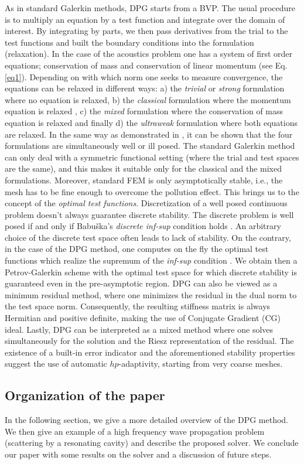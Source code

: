 As in standard Galerkin methods, DPG starts from a BVP. The usual procedure is to multiply an equation by a test function and integrate over the domain of interest. By integrating by parts, we then pass derivatives from the trial to the test functions and built the boundary conditions into the formulation (relaxation). In the case of the acoustics problem one has a system of first order equations; conservation of mass and conservation of linear momentum (see Eq. \ref{eq1}). Depending on with which norm one seeks to measure convergence, the equations can be relaxed in different ways: a) the \textit{trivial} or \textit{strong} formulation where no equation is relaxed, b) the \textit{classical} formulation where the momentum equation is relaxed , c) the \textit{mixed} formulation where the conservation of mass equation is relaxed and finally d) the \textit{ultraweak} formulation where both equations are relaxed. In the same way as demonstrated in \cite{demk_varform,Carstensen,MR3543022}, it can be shown that the four formulations are simultaneously well or ill posed. The standard Galerkin method can only deal with a symmetric functional setting (where the trial and test spaces are the same), and this makes it suitable only for the classical and the mixed formulations. Moreover, standard FEM is only asymptotically stable, i.e., the mesh has to be fine enough to overcome the pollution effect. This brings us to the concept of the \textit{optimal test functions}.
% 
Discretization of a well posed continuous problem doesn't always guarantee discrete stability. The discrete problem is well posed if and only if 
Babu\v{s}ka's \textit{discrete inf-sup} condition holds \cite{babuska}. An arbitrary choice of the discrete test space often leads to lack of stability. On the contrary, in the case of the DPG method, one computes on the fly the optimal test functions which realize the supremum of the \textit{inf-sup} condition \cite{dpg_opt}. We obtain then a Petrov-Galerkin scheme with the optimal test space for which discrete stability is guaranteed even in the pre-asymptotic region.
% 
DPG can also be viewed as a minimum residual method, where one minimizes the residual in the dual norm to the test space norm. Consequently, the resulting stiffness matrix is always Hermitian and positive definite, making the use of Conjugate Gradient (CG) ideal. 
% 
Lastly, DPG can be interpreted as a mixed method where one solves simultaneously for the solution and the Riesz representation of the residual. The existence of a built-in error indicator and the aforementioned stability properties suggest the use of automatic $hp$-adaptivity, starting from very coarse meshes.
% 
% 
\subsection{Organization of the paper}

In the following section, we give a more detailed overview of the DPG method. We then give an example of a high frequency wave propagation problem (scattering by a resonating cavity) and describe the proposed solver. We conclude our paper with some results on the solver and a discussion of future steps.






